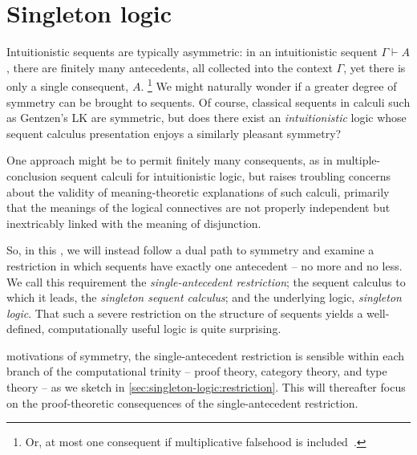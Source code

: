 \chapter{Singleton logic}\label{ch:singleton-logic}

Intuitionistic sequents are typically asymmetric:
in an intuitionistic sequent $\Gamma \vdash A$, there are finitely many antecedents, all collected into the context $\Gamma$, yet there is only a single consequent, $A$.%
\footnote{Or, at most one consequent if multiplicative falsehood is included~.}
We might naturally wonder if a greater degree of symmetry can be brought to sequents.
Of course, classical sequents in calculi such as Gentzen's LK\autocite{Gentzen:} are symmetric, but does there exist an \emph{intuitionistic} logic whose sequent calculus presentation enjoys a similarly pleasant symmetry?

One approach might be to permit finitely many consequents, as in multiple-conclusion sequent calculi for intuitionistic logic\autocites{Maehara:NMJ54}{Kleene:NH52}{dePaiva+:??}, but \citeauthor{Steinberger:JPL11}\autocite{Steinberger:JPL11} raises troubling concerns about the validity of meaning-theoretic explanations of such calculi, primarily that the meanings of the logical connectives are not properly independent but inextricably linked with the meaning of disjunction.

So, in this , we will instead follow a dual path to symmetry and examine a restriction in which sequents have exactly one antecedent -- no more and no less.
We call this requirement the \emph{single-antecedent restriction}; the sequent calculus to which it leads, the \emph{singleton sequent calculus}; and the underlying logic, \emph{singleton logic}.
That such a severe restriction on the structure of sequents yields a well-defined, computationally useful logic is quite surprising.

 motivations of symmetry, the single-antecedent restriction is sensible within each branch of the computational trinity\autocite{Harper:??} -- proof theory, category theory, and type theory -- as we sketch in \cref{sec:singleton-logic:restriction}.
This  will thereafter focus on the proof-theoretic consequences of the single-antecedent restriction.

